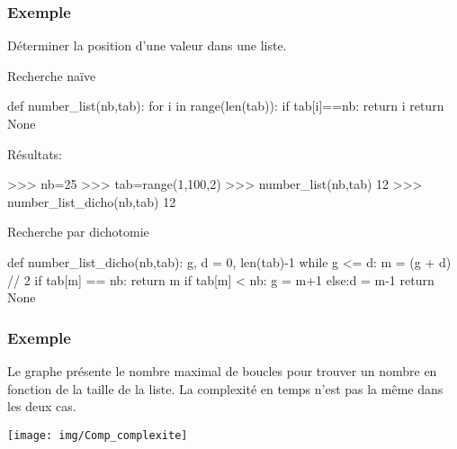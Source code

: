 \begin{frame}[fragile]
\frametitle{Exemple}

Déterminer la position d'une valeur dans une liste.

\begin{minipage}[t]{0.48\linewidth}
Recherche naïve
\begin{GrayBox}[0.75\textwidth]
\begin{verbatimtab}[3]
def number_list(nb,tab):
    for i in range(len(tab)):
        if tab[i]==nb:
            return i
    return None
\end{verbatimtab}
\end{GrayBox}

Résultats:
\begin{GrayBox}[0.85\textwidth]
\begin{verbatimtab}[3]
>>> nb=25
>>> tab=range(1,100,2)
>>> number_list(nb,tab)
12
>>> number_list_dicho(nb,tab)
12
\end{verbatimtab}
\end{GrayBox}

\end{minipage}\hfill
\begin{minipage}[t]{0.48\linewidth}
Recherche par dichotomie
\begin{GrayBox}[0.85\textwidth]
\begin{verbatimtab}[3]
def number_list_dicho(nb,tab):
    g, d = 0, len(tab)-1
    while g <= d:
        m = (g + d) // 2
        if tab[m] == nb:
            return m
        if tab[m] < nb:
            g = m+1
        else:d = m-1
    return None
\end{verbatimtab}
\end{GrayBox}
\end{minipage}
\end{frame}

\begin{frame}[fragile]
\frametitle{Exemple}

Le graphe présente le nombre maximal de boucles pour trouver un nombre en fonction de la taille de la liste. La complexité en temps n'est pas la même dans les deux cas.

\begin{center}
 \texttt{[image: img/Comp\_complexite]}
\end{center}

\end{frame}

